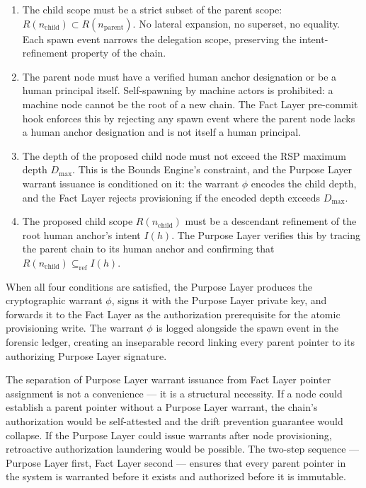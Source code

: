 \begin{enumerate}
    \item[(S1) \textbf{Scope refinement}] The child scope must be a strict subset of the parent scope: $R(n_{\mathrm{child}}) \subset R(n_{\mathrm{parent}})$. No lateral expansion, no superset, no equality. Each spawn event narrows the delegation scope, preserving the intent-refinement property of the chain.

    \item[(S2) \textbf{Human anchor verification}] The parent node must have a verified human anchor designation or be a human principal itself. Self-spawning by machine actors is prohibited: a machine node cannot be the root of a new chain. The Fact Layer pre-commit hook enforces this by rejecting any spawn event where the parent node lacks a human anchor designation and is not itself a human principal.

    \item[(S3) \textbf{Depth bound compliance}] The depth of the proposed child node must not exceed the RSP maximum depth $D_{\max}$. This is the Bounds Engine's constraint, and the Purpose Layer warrant issuance is conditioned on it: the warrant $\phi$ encodes the child depth, and the Fact Layer rejects provisioning if the encoded depth exceeds $D_{\max}$.

    \item[(S4) \textbf{Purpose alignment}] The proposed child scope $R(n_{\mathrm{child}})$ must be a descendant refinement of the root human anchor's intent $I(h)$. The Purpose Layer verifies this by tracing the parent chain to its human anchor and confirming that $R(n_{\mathrm{child}}) \subseteq_{\mathrm{ref}} I(h)$.
\end{enumerate}

When all four conditions are satisfied, the Purpose Layer produces the cryptographic warrant $\phi$, signs it with the Purpose Layer private key, and forwards it to the Fact Layer as the authorization prerequisite for the atomic provisioning write. The warrant $\phi$ is logged alongside the spawn event in the forensic ledger, creating an inseparable record linking every parent pointer to its authorizing Purpose Layer signature.

The separation of Purpose Layer warrant issuance from Fact Layer pointer assignment is not a convenience --- it is a structural necessity. If a node could establish a parent pointer without a Purpose Layer warrant, the chain's authorization would be self-attested and the drift prevention guarantee would collapse. If the Purpose Layer could issue warrants after node provisioning, retroactive authorization laundering would be possible. The two-step sequence --- Purpose Layer first, Fact Layer second --- ensures that every parent pointer in the system is warranted before it exists and authorized before it is immutable.

